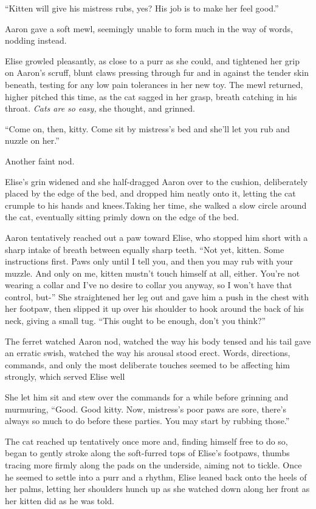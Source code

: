 ``Kitten will give his mistress rubs, yes? His job is to make her feel good.''

Aaron gave a soft mewl, seemingly unable to form much in the way of words, nodding instead.

Elise growled pleasantly, as close to a purr as she could, and tightened her grip on Aaron's scruff, blunt claws pressing through fur and in against the tender skin beneath, testing for any low pain tolerances in her new toy. The mewl returned, higher pitched this time, as the cat sagged in her grasp, breath catching in his throat. \textit{Cats are so easy,} she thought, and grinned.

``Come on, then, kitty. Come sit by mistress's bed and she'll let you rub and nuzzle on her.''

Another faint nod.

Elise's grin widened and she half-dragged Aaron over to the cushion, deliberately placed by the edge of the bed, and dropped him neatly onto it, letting the cat crumple to his hands and knees.Taking her time, she walked a slow circle around the cat, eventually sitting primly down on the edge of the bed.

Aaron tentatively reached out a paw toward Elise, who stopped him short with a sharp intake of breath between equally sharp teeth. ``Not yet, kitten. Some instructions first. Paws only until I tell you, and then you may rub with your muzzle. And only on me, kitten mustn't touch himself at all, either. You're not wearing a collar and I've no desire to collar you anyway, so I won't have that control, but-'' She straightened her leg out and gave him a push in the chest with her footpaw, then slipped it up over his shoulder to hook around the back of his neck, giving a small tug. ``This ought to be enough, don't you think?''

The ferret watched Aaron nod, watched the way his body tensed and his tail gave an erratic swish, watched the way his arousal stood erect. Words, directions, commands, and only the most deliberate touches seemed to be affecting him strongly, which served Elise well

She let him sit and stew over the commands for a while before grinning and murmuring, ``Good. Good kitty. Now, mistress's poor paws are sore, there's always so much to do before these parties. You may start by rubbing those.''

The cat reached up tentatively once more and, finding himself free to do so, began to gently stroke along the soft-furred tops of Elise's footpaws, thumbs tracing more firmly along the pads on the underside, aiming not to tickle. Once he seemed to settle into a purr and a rhythm, Elise leaned back onto the heels of her palms, letting her shoulders hunch up as she watched down along her front as her kitten did as he was told.

